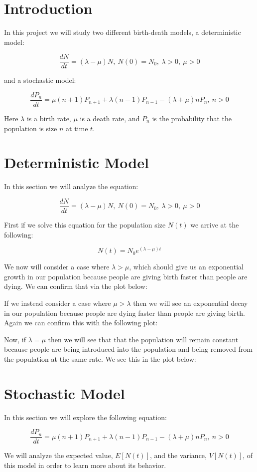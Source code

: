 \documentclass[11pt, oneside]{article}   	%
\begin{document}
\section{Introduction}

In this project we will study two different birth-death models, a deterministic model:

$$\frac{dN}{dt} = (\lambda -\mu)N, \ N(0)=N_0, \ \lambda > 0, \ \mu > 0$$

and a stochastic model:

$$\frac{dP_n}{dt} = \mu (n+1)P_{n+1}+\lambda (n-1)P_{n-1}-(\lambda+\mu)nP_n, \ n>0$$

Here $\lambda$ is a birth rate, $\mu$ is a death rate, and $P_n$ is the probability that the population is size $n$ at time $t$.

\section{Deterministic Model}

In this section we will analyze the equation:

$$\frac{dN}{dt} = (\lambda -\mu)N, \ N(0)=N_0, \ \lambda > 0, \ \mu > 0$$

First if we solve this equation for the population size $N(t)$ we arrive at the following:

$$N(t) = N_0 e^{(\lambda-\mu)t}$$

We now will consider a case where $\lambda > \mu$, which should give us an exponential growth in our population because people are giving birth faster than people are dying.
We can confirm that via the plot below:


If we instead consider a case where $\mu > \lambda$ then we will see an exponential decay in our population because people are dying faster than people are giving birth.
Again we can confirm this with the following plot:


Now, if $\lambda = \mu$ then we will see that that the population will remain constant because people are being introduced into the population and being removed from the population at the same rate.
We see this in the plot below:


\section{Stochastic Model}

In this section we will explore the following equation:

$$\frac{dP_n}{dt} = \mu (n+1)P_{n+1}+\lambda (n-1)P_{n-1}-(\lambda+\mu)nP_n, \ n>0$$

We will analyze the expected value, $E[N(t)]$, and the variance, $V[N(t)]$, of this model in order to learn more about its behavior.
\end{document}
